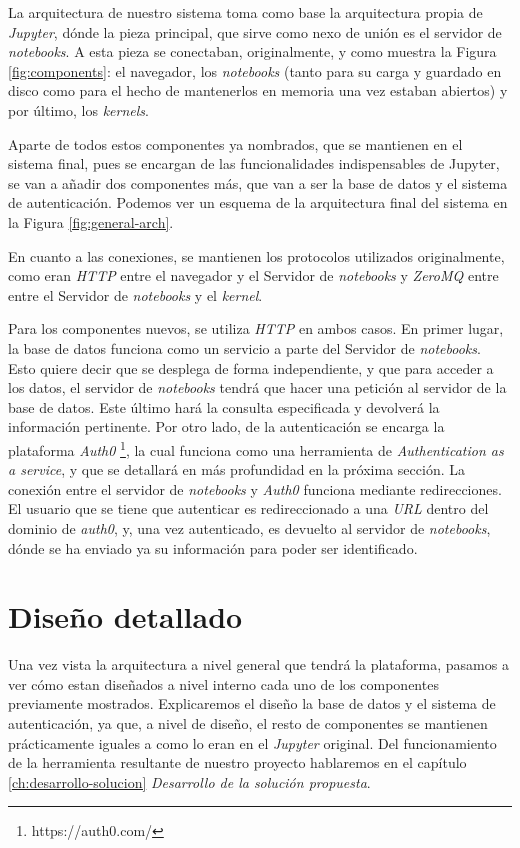 \documentclass[11pt,spanish,listoffigures]{tfgetsinf}
\begin{document}
La arquitectura de nuestro sistema toma como base la arquitectura propia de \textit{Jupyter}, dónde la pieza principal, que sirve como nexo de unión es el servidor de \textit{notebooks}. A esta pieza se conectaban, originalmente, y como muestra la Figura \ref{fig:components}: el navegador, los \textit{notebooks} (tanto para su carga y guardado en disco como para el hecho de mantenerlos en memoria una vez estaban abiertos) y por último, los \textit{kernels}.

Aparte de todos estos componentes ya nombrados, que se mantienen en el sistema final, pues se encargan de las funcionalidades indispensables de Jupyter, se van a añadir dos componentes más, que van a ser la base de datos y el sistema de autenticación. Podemos ver un esquema de la arquitectura final del sistema en la Figura \ref{fig:general-arch}.

En cuanto a las conexiones, se mantienen los protocolos utilizados originalmente, como eran \textit{HTTP} entre el navegador y el Servidor de \textit{notebooks} y \textit{ZeroMQ} entre entre el Servidor de \textit{notebooks} y el \textit{kernel}. 

Para los componentes nuevos, se utiliza \textit{HTTP} en ambos casos. En primer lugar, la base de datos funciona como un servicio a parte del Servidor de \textit{notebooks}. Esto quiere decir que se desplega de forma independiente, y que para acceder a los datos, el servidor de \textit{notebooks} tendrá que hacer una petición al servidor de la base de datos. Este último hará la consulta especificada y devolverá la información pertinente. Por otro lado, de la autenticación se encarga la plataforma \textit{Auth0} \footnote{https://auth0.com/}, la cual funciona como una herramienta de \textit{Authentication as a service}, y que se detallará en más profundidad en la próxima sección. La conexión entre el servidor de \textit{notebooks} y \textit{Auth0} funciona mediante redirecciones. El usuario que se tiene que autenticar es redireccionado a una \textit{URL} dentro del dominio de \textit{auth0}, y, una vez autenticado, es devuelto al servidor de \textit{notebooks}, dónde se ha enviado ya su información para poder ser identificado. 



\section{Diseño detallado}
\label{sec:diseno-detallado}

Una vez vista la arquitectura a nivel general que tendrá la plataforma, pasamos a ver cómo estan diseñados a nivel interno cada uno de los componentes previamente mostrados. Explicaremos  el diseño la base de datos y el sistema de autenticación, ya que, a nivel de diseño, el resto de componentes se mantienen prácticamente iguales a como lo eran en el \textit{Jupyter} original. Del funcionamiento de la herramienta resultante de nuestro proyecto hablaremos en el capítulo \ref{ch:desarrollo-solucion} \textit{Desarrollo de la solución propuesta}.
\end{document}
